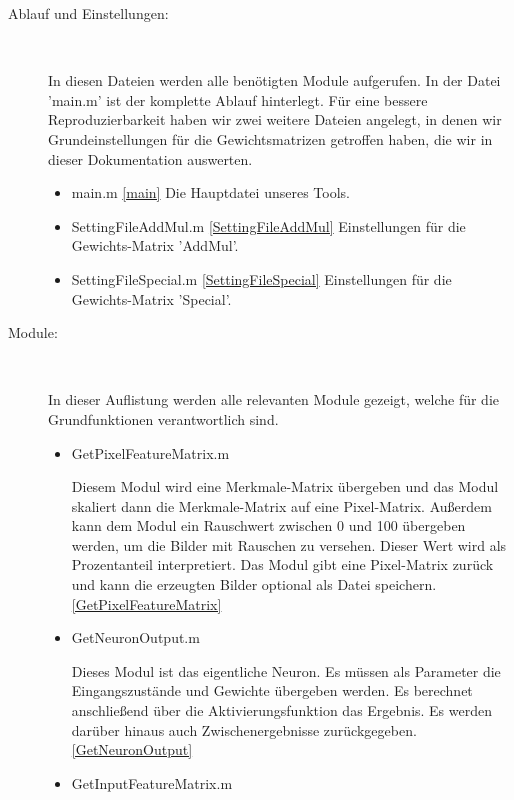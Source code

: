 \begin{description}
	\item[Ablauf und Einstellungen:]~\par
	
	In diesen Dateien werden alle benötigten Module aufgerufen. In der Datei 'main.m' ist der komplette Ablauf hinterlegt. Für eine bessere Reproduzierbarkeit haben wir zwei weitere Dateien angelegt, in denen wir Grundeinstellungen für die Gewichtsmatrizen getroffen haben, die wir in dieser Dokumentation auswerten.
	
	\begin{itemize}
		\item main.m \ref{main}  Die Hauptdatei unseres Tools. 
		\item SettingFileAddMul.m \ref{SettingFileAddMul}  Einstellungen für die Gewichts-Matrix 'AddMul'.
		
		\item SettingFileSpecial.m \ref{SettingFileSpecial} Einstellungen für die Gewichts-Matrix 'Special'.
		
	\end{itemize}
	
	\item[Module:]~\par
	
	In dieser Auflistung werden alle relevanten Module gezeigt, welche für die Grundfunktionen verantwortlich sind.
	
	\begin{itemize}
		\item GetPixelFeatureMatrix.m  
		
		Diesem Modul wird eine Merkmale-Matrix übergeben und das Modul skaliert dann die Merkmale-Matrix auf eine Pixel-Matrix. Außerdem kann dem Modul ein Rauschwert zwischen 0 und 100 übergeben werden, um die Bilder mit Rauschen zu versehen. Dieser Wert wird als Prozentanteil interpretiert. Das Modul gibt eine Pixel-Matrix zurück und kann die erzeugten Bilder optional als Datei speichern. \ref{GetPixelFeatureMatrix}
		
		\item GetNeuronOutput.m  
		
		Dieses Modul ist das eigentliche Neuron. Es müssen als Parameter die Eingangszustände und Gewichte übergeben werden. Es berechnet anschließend über die Aktivierungsfunktion das Ergebnis. Es werden darüber hinaus auch Zwischenergebnisse zurückgegeben. \ref{GetNeuronOutput}
		
		\item GetInputFeatureMatrix.m  
		

\end{itemize}
\end{description}
